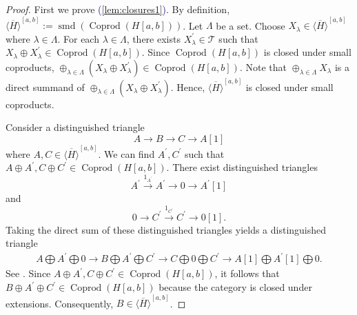 \documentclass[11pt]{amsart}
\def\eqref#1{\textcolor{darkblue}{(\ref{#1})}}
\theoremstyle{plain}
\theoremstyle{definition}
\numberwithin{equation}{section}
\numberwithin{theorem}{section}
\begin{document}
\begin{proof}
    First we prove \eqref{lem:closures1}.
    By definition, $\overline{\langle H\rangle}^{[a,b]} := \operatorname{smd}(\operatorname{Coprod}(H[a,b]))$. 
    Let $\Lambda$ be a set.
    Choose $X_\lambda \in \overline{\langle H\rangle}^{[a,b]}$ where $\lambda \in \Lambda$. 
    For each $\lambda \in \Lambda$, there exists $X^\prime_\lambda \in \mathcal{T}$ such that $X_\lambda \oplus X^\prime_\lambda\in \operatorname{Coprod}(H[a,b])$.
    Since $\operatorname{Coprod}(H[a,b])$ is closed under small coproducts, $\oplus_{\lambda\in \Lambda} (X_\lambda \oplus X^\prime_\lambda)\in \operatorname{Coprod}(H[a,b])$. 
    Note that $\oplus_{\lambda\in \Lambda}X_\lambda$ is a direct summand of $\oplus_{\lambda\in \Lambda} (X_\lambda \oplus X^\prime_\lambda)$. 
    Hence, $\overline{\langle H\rangle}^{[a,b]}$ is closed under small coproducts. 

    Consider a distinguished triangle 
    \begin{displaymath}
        A \to B \to C \to A[1]
    \end{displaymath}
    where $A,C\in \overline{\langle H\rangle}^{[a,b]}$. 
    We can find $A^\prime,C^\prime$ such that $A\oplus A^\prime, C\oplus C^\prime \in \operatorname{Coprod}(H[a,b])$. 
    There exist distinguished triangles
    \begin{displaymath}
        A^\prime \xrightarrow{1_{A^\prime}} A^\prime \to 0 \to A^\prime[1]
    \end{displaymath}
    and \begin{displaymath}
        0 \to C^\prime \xrightarrow{1_{C^\prime}} C^\prime \to 0[1].
    \end{displaymath}
    Taking the direct sum of these distinguished triangles yields a distinguished triangle 
    \begin{displaymath}
        \begin{aligned}
            A\bigoplus A^\prime \bigoplus 0 
            \to B \bigoplus A^\prime \bigoplus C^\prime
            \to C \bigoplus 0 \bigoplus C^\prime \to A[1]\bigoplus A^\prime[1] \bigoplus 0.
        \end{aligned}
    \end{displaymath}
    See \cite[Proposition 1.2.1]{Neeman:2001}. 
    Since $A\oplus A^\prime, C\oplus C^\prime\in  \operatorname{Coprod}(H[a,b])$, it follows that $B \oplus A^\prime \oplus C^\prime\in \operatorname{Coprod}(H[a,b])$ because the category is closed under extensions.
    Consequently, $B \in \overline{\langle H\rangle}^{[a,b]}$.


\end{proof}
\end{document}
